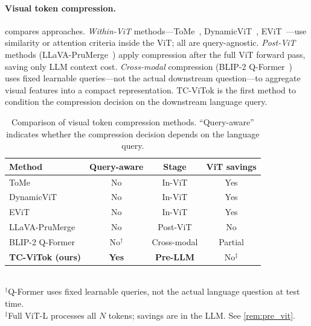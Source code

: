 \documentclass[11pt,a4paper]{article}
\begin{document}
\paragraph{Visual token compression.}
 compares approaches. \emph{Within-ViT}
methods---ToMe~\citep{bolya2022token}, DynamicViT~\citep{rao2021dynamicvit},
EViT~\citep{liang2022evit}---use similarity or attention criteria inside the
ViT; all are query-agnostic. \emph{Post-ViT} methods
(LLaVA-PruMerge~\citep{shang2024llava}) apply compression after the full ViT
forward pass, saving only LLM context cost. \emph{Cross-modal} compression
(BLIP-2 Q-Former~\citep{li2023blip2}) uses fixed learnable queries---not the
actual downstream question---to aggregate visual features into a compact
representation. TC-ViTok is the first method to condition the compression
decision on the downstream language query.

\begin{table}[t]
\centering
\caption{Comparison of visual token compression methods. ``Query-aware''
indicates whether the compression decision depends on the language query.}
\label{tab:related_comparison}
\renewcommand{\arraystretch}{1.15}
\begin{tabular}{@{}lccc@{}}
  \toprule
  Method & Query-aware & Stage & ViT savings \\
  \midrule
  ToMe~\citep{bolya2022token}          & No  & In-ViT       & Yes \\
  DynamicViT~\citep{rao2021dynamicvit} & No  & In-ViT       & Yes \\
  EViT~\citep{liang2022evit}           & No  & In-ViT       & Yes \\
  LLaVA-PruMerge~\citep{shang2024llava}& No  & Post-ViT     & No  \\
  BLIP-2 Q-Former~\citep{li2023blip2}  & No$^\dagger$
                                               & Cross-modal  & Partial \\
  \textbf{TC-ViTok (ours)}             & \textbf{Yes}
                                               & \textbf{Pre-LLM}
                                                             & No$^\ddagger$ \\
  \bottomrule
\end{tabular}\\[4pt]
{\footnotesize
  $^\dagger$Q-Former uses fixed learnable queries, not the actual language
  question at test time.\\
  $^\ddagger$Full ViT-L processes all $N$ tokens; savings are in the LLM.
  See \cref{rem:pre_vit}.}
\end{table}
\end{document}

